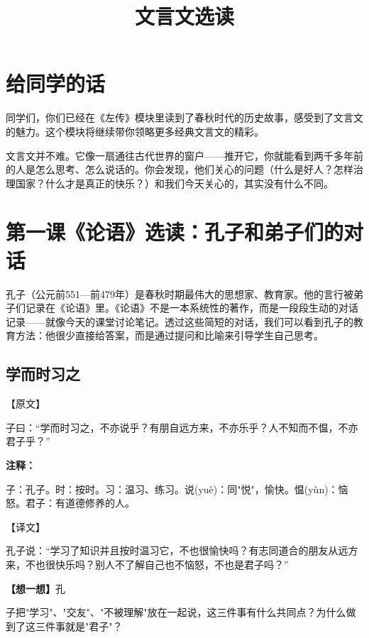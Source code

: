 \documentclass[a4paper,12pt]{ctexart}
\title{\textcolor{blue!70!black}{\Huge\textbf{文言文选读}}}
\author{}
\date{}
\newcommand{\annlist}[1]{{\vspace{0.15cm}\noindent\textcolor{orange!80!black}{\small\bfseries 注释：}\par\footnotesize #1\par}}
\newcommand{\thinkq}[1]{\vspace{0.2cm}\noindent\textcolor{orange!60!black}{\small\bfseries【想一想】}{\small #1}\par}
\begin{document}
\maketitle
\thispagestyle{empty}

\section*{\textcolor{blue!70!black}{给同学的话}}

同学们，你们已经在《左传》模块里读到了春秋时代的历史故事，感受到了文言文的魅力。这个模块将继续带你领略更多经典文言文的精彩。

文言文并不难。它像一扇通往古代世界的窗户——推开它，你就能看到两千多年前的人是怎么思考、怎么说话的。你会发现，他们关心的问题（什么是好人？怎样治理国家？什么才是真正的快乐？）和我们今天关心的，其实没有什么不同。

\newpage

\section{\textcolor{orange!80!black}{第一课\quad 《论语》选读：孔子和弟子们的对话}}

孔子（公元前551—前479年）是春秋时期最伟大的思想家、教育家。他的言行被弟子们记录在《论语》里。《论语》不是一本系统性的著作，而是一段段生动的对话记录——就像今天的课堂讨论笔记。透过这些简短的对话，我们可以看到孔子的教育方法：他很少直接给答案，而是通过提问和比喻来引导学生自己思考。

\subsection*{学而时习之}

\noindent\textcolor{blue!70!black}{\large【原文】}

子曰：\textquotedblleft 学而时习之，不亦说乎？有朋自远方来，不亦乐乎？人不知而不愠，不亦君子乎？\textquotedblright

\annlist{子：孔子。时：按时。习：温习、练习。说(yuè)：同"悦"，愉快。愠(yùn)：恼怒。君子：有道德修养的人。}

\noindent\textcolor{green!60!black}{\large【译文】}

孔子说：\textquotedblleft 学习了知识并且按时温习它，不也很愉快吗？有志同道合的朋友从远方来，不也很快乐吗？别人不了解自己也不恼怒，不也是君子吗？\textquotedblright

\thinkq 孔子把"学习"、"交友"、"不被理解"放在一起说，这三件事有什么共同点？为什么做到了这三件事就是"君子"？
\end{document}
